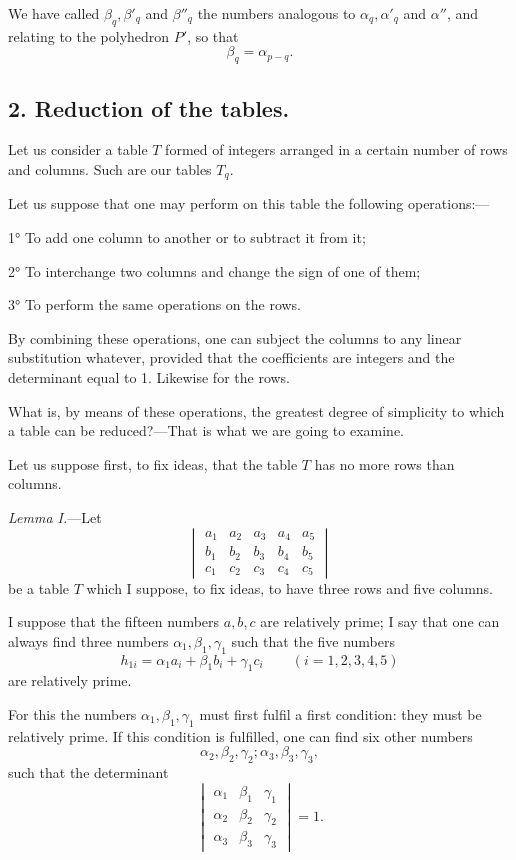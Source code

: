 \documentclass{article}
\begin{document}
We have called $\beta_{q}, \beta'_{q}$ and $\beta''_{q}$ the numbers analogous to $\alpha_{q}, \alpha'_{q}$ and $\alpha''$, and relating to the polyhedron $P'$, so that
\[ \beta_{q} = \alpha_{p-q}. \]

\subsection*{2. Reduction of the tables.}

Let us consider a table $T$ formed of integers arranged in a certain number of rows and columns. Such are our tables $T_{q}$.

Let us suppose that one may perform on this table the following operations:---

1° To add one column to another or to subtract it from it;

2° To interchange two columns and change the sign of one of them;

3° To perform the same operations on the rows.

By combining these operations, one can subject the columns to any linear substitution whatever, provided that the coefficients are integers and the determinant equal to 1. Likewise for the rows.

What is, by means of these operations, the greatest degree of simplicity to which a table can be reduced?---That is what we are going to examine.

Let us suppose first, to fix ideas, that the table $T$ has no more rows than columns.

\emph{Lemma I.}---Let
\[ \begin{vmatrix} a_{1} & a_{2} & a_{3} & a_{4} & a_{5} \\[1ex] b_{1} & b_{2} & b_{3} & b_{4} & b_{5} \\[1ex] c_{1} & c_{2} & c_{3} & c_{4} & c_{5} \end{vmatrix} \]
be a table $T$ which I suppose, to fix ideas, to have three rows and five columns.

I suppose that the fifteen numbers $a, b, c$ are relatively prime; I say that one can always find three numbers $\alpha_{1}, \beta_{1}, \gamma_{1}$ such that the five numbers
\[ h_{1i} = \alpha_{1} a_{i} + \beta_{1} b_{i} + \gamma_{1} c_{i} \qquad (i = 1, 2, 3, 4, 5) \]
are relatively prime.

For this the numbers $\alpha_{1}, \beta_{1}, \gamma_{1}$ must first fulfil a first
condition: they must be relatively prime. If this condition is fulfilled, one can find six other numbers
\[ \alpha_{2}, \beta_{2}, \gamma_{2}; \alpha_{3}, \beta_{3}, \gamma_{3}, \]
such that the determinant
\[ \begin{vmatrix} \alpha_{1} & \beta_{1} & \gamma_{1} \\[1ex] \alpha_{2} & \beta_{2} & \gamma_{2} \\[1ex] \alpha_{3} & \beta_{3} & \gamma_{3} \end{vmatrix} = 1. \]
\end{document}
